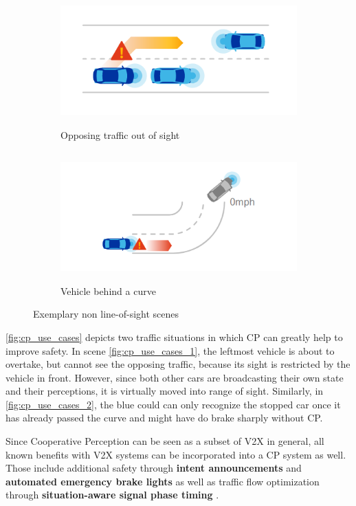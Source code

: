 \begin{figure}[h]
	
	\begin{subfigure}{0.5\textwidth}
		\includegraphics[width=1.0\linewidth, height=5cm]{98_images/nloss_2.png} 
		\caption{Opposing traffic out of sight}
		\label{fig:cp_use_cases_1}
	\end{subfigure}
	\begin{subfigure}{0.5\textwidth}
		\includegraphics[width=1.2\linewidth, height=5cm]{98_images/nloss_3.png}
		\caption{Vehicle behind a curve}
		\label{fig:cp_use_cases_2}
	\end{subfigure}
	
	\caption[Exemplary non line-of-sight scenes]{Exemplary non line-of-sight scenes \cite{QualcommTechnologiesInc.2017}}
	\label{fig:cp_use_cases}
\end{figure}

\autoref{fig:cp_use_cases} depicts two traffic situations in which CP can greatly help to improve safety. In scene \autoref{fig:cp_use_cases_1}, the leftmost vehicle is about to overtake, but cannot see the opposing traffic, because its sight is restricted by the vehicle in front. However, since both other cars are broadcasting their own state and their perceptions, it is virtually moved into range of sight. Similarly, in \autoref{fig:cp_use_cases_2}, the blue could can only recognize the stopped car once it has already passed the curve and might have do brake sharply without CP.

Since Cooperative Perception can be seen as a subset of V2X in general, all known benefits with V2X systems can be incorporated into a CP system as well. Those include additional safety through \textbf{intent announcements} and \textbf{automated emergency brake lights} as well as traffic flow optimization through \textbf{situation-aware signal phase timing} \cite{5GAutomotiveAssociation2019b}.

